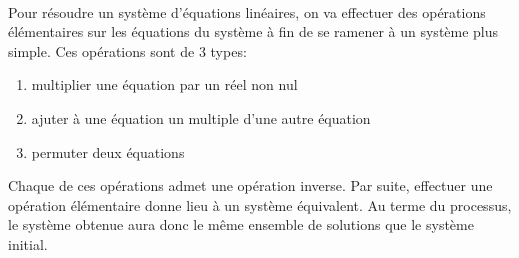 \paragraph{} Pour résoudre un système d'équations linéaires, on va effectuer des opérations élémentaires sur les équations du système à fin de se ramener à un système plus simple. Ces opérations sont de 3 types:
\begin{enumerate}[ a)]
  \item multiplier une équation par un réel non nul
  \item ajuter à une équation un multiple d'une autre équation
  \item permuter deux équations
\end{enumerate}
Chaque de ces opérations admet une opération inverse. Par suite, effectuer une opération élémentaire donne lieu à un système équivalent. Au terme du processus, le système obtenue aura donc le même ensemble de solutions que le système initial.

